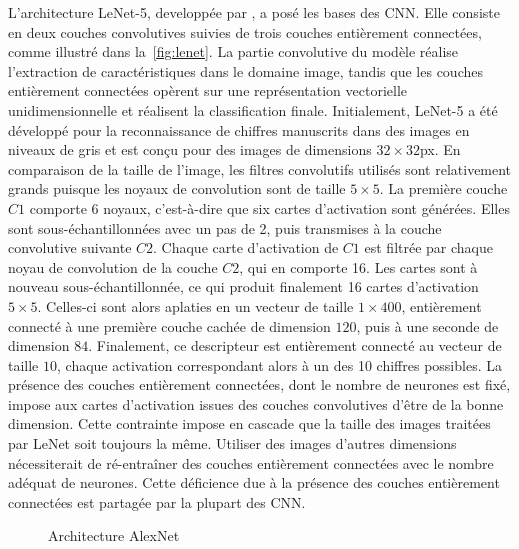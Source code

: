 L'architecture LeNet-5, developpée par \citet{lecun_gradient-based_1998}, a posé les bases des \gls{CNN}. Elle consiste en deux couches convolutives suivies de trois couches entièrement connectées, comme illustré dans la~\cref{fig:lenet}. La partie convolutive du modèle réalise l'extraction de caractéristiques dans le domaine image, tandis que les couches entièrement connectées opèrent sur une représentation vectorielle unidimensionnelle et réalisent la classification finale. Initialement, LeNet-5 a été développé pour la reconnaissance de chiffres manuscrits dans des images en niveaux de gris et est conçu pour des images de dimensions $32\times32$px. En comparaison de la taille de l'image, les filtres convolutifs utilisés sont relativement grands puisque les noyaux de convolution sont de taille $5\times5$. La première couche $C1$ comporte 6 noyaux, c'est-à-dire que six cartes d'activation sont générées. Elles sont sous-échantillonnées avec un pas de 2, puis transmises à la couche convolutive suivante $C2$. Chaque carte d'activation de $C1$ est filtrée par chaque noyau de convolution de la couche $C2$, qui en comporte 16. Les cartes sont à nouveau sous-échantillonnée, ce qui produit finalement 16 cartes d'activation $5\times5$. Celles-ci sont alors aplaties en un vecteur de taille $1\times400$, entièrement connecté à une première couche cachée de dimension $120$, puis à une seconde de dimension $84$. Finalement, ce descripteur est entièrement connecté au vecteur de taille $10$, chaque activation correspondant alors à un des 10 chiffres possibles. La présence des couches entièrement connectées, dont le nombre de neurones est fixé, impose aux cartes d'activation issues des couches convolutives d'être de la bonne dimension. Cette contrainte impose en cascade que la taille des images traitées par LeNet soit toujours la même. Utiliser des images d'autres dimensions nécessiterait de ré-entraîner des couches entièrement connectées avec le nombre adéquat de neurones. Cette déficience due à la présence des couches entièrement connectées est partagée par la plupart des \gls{CNN}.

\begin{figure}[t]
  \resizebox{\textwidth}{!}{
    
  }
  \caption{Architecture AlexNet~\cite{krizhevsky_imagenet_2012}}
  \label{fig:alexnet}
\end{figure}


